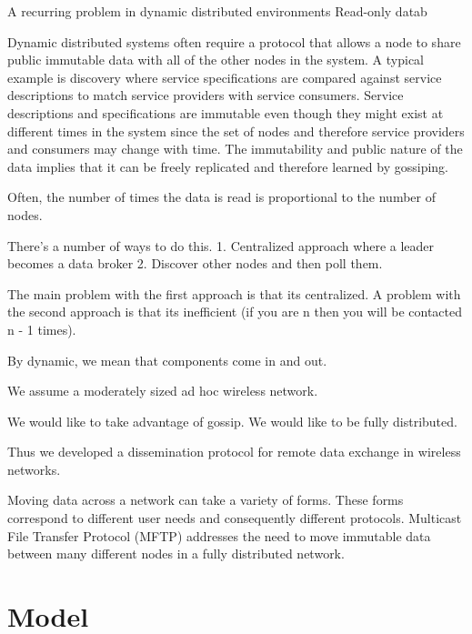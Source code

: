 \documentclass[letterpaper]{article}
\begin{document}
A recurring problem in dynamic distributed environments Read-only datab

Dynamic distributed systems often require a protocol that allows a node to share public immutable data with all of the other nodes in the system.
A typical example is discovery where service specifications are compared against service descriptions to match service providers with service consumers.
Service descriptions and specifications are immutable even though they might exist at different times in the system since the set of nodes and therefore service providers and consumers may change with time.
The immutability and public nature of the data implies that it can be freely replicated and therefore learned by gossiping.






Often, the number of times the data is read is proportional to the number of nodes.





There's a number of ways to do this.
1.  Centralized approach where a leader becomes a data broker
2.  Discover other nodes and then poll them.

The main problem with the first approach is that its centralized.
A problem with the second approach is that its inefficient (if you are n then you will be contacted n - 1 times).

By dynamic, we mean that components come in and out.

We assume a moderately sized ad hoc wireless network.

We would like to take advantage of gossip.
We would like to be fully distributed.

Thus we developed a dissemination protocol for remote data exchange in wireless networks.

Moving data across a network can take a variety of forms. 
These forms correspond to different user needs and consequently different protocols. 
Multicast File Transfer Protocol (MFTP) addresses the need to move immutable data between many different nodes in a fully distributed network. 

\section{Model\label{model}}
\end{document}
